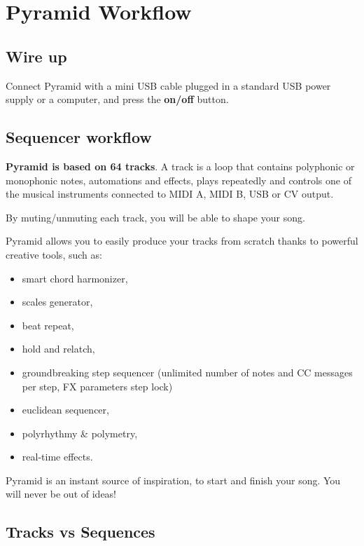 \chapter{Pyramid Workflow}

\section{Wire up}

Connect Pyramid with a mini USB cable plugged in a standard USB power supply or a computer, and press the \textbf{on/off} button.


\section{Sequencer workflow}

\textbf{Pyramid is based on 64 tracks}. A track is a loop that contains polyphonic or monophonic notes, automations and effects, plays repeatedly and controls one of the musical instruments connected to MIDI A, MIDI B, USB or CV output.

By muting/unmuting each track, you will be able to shape your song.


Pyramid allows you to easily produce your tracks from scratch thanks to powerful creative tools, such as:
\begin{itemize} %
\item smart chord harmonizer,
\item scales generator,
\item beat repeat,
\item hold and relatch,
\item groundbreaking step sequencer (unlimited number of notes and CC messages per step, FX parameters step lock)
\item euclidean sequencer,
\item polyrhythmy \& polymetry,
\item real-time effects.
\end{itemize}

Pyramid is an instant source of inspiration, to start and finish your song. You will never be out of ideas!


\section{Tracks vs Sequences} 

